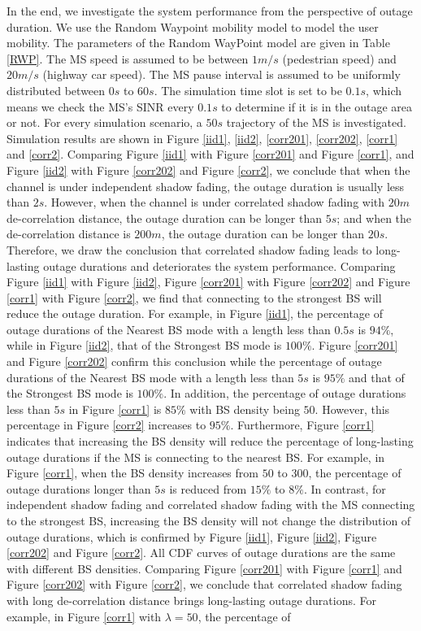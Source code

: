  \par In the end, we investigate the system performance from the perspective of outage duration. We use the Random Waypoint mobility model to model the user mobility. The parameters of the Random WayPoint model are given in Table \ref{RWP}. The MS speed is assumed to be between $1m/s$ (pedestrian speed) and $20m/s$ (highway car speed). The MS pause interval is assumed to be uniformly distributed between $0s$ to $60s$. The simulation time slot is set to be $0.1s$, which means we check the MS's SINR every $0.1s$ to determine if it is in the outage area or not. For every simulation scenario, a $50s$ trajectory of the MS is investigated. Simulation results are shown in Figure \ref{iid1}, \ref{iid2}, \ref{corr201}, \ref{corr202}, \ref{corr1} and \ref{corr2}. Comparing Figure \ref{iid1} with Figure \ref{corr201} and Figure \ref{corr1}, and Figure \ref{iid2} with Figure \ref{corr202} and Figure \ref{corr2}, we conclude that when the channel is under independent shadow fading, the outage duration is usually less than $2s$. However,  when the channel is under correlated shadow fading with $20m$ de-correlation distance, the outage duration can be longer than $5s$; and when the de-correlation distance is $200m$, the outage duration can be longer than $20s$. Therefore, we draw the conclusion that correlated shadow fading leads to long-lasting outage durations and deteriorates the system performance. Comparing Figure \ref{iid1} with Figure \ref{iid2}, Figure \ref{corr201} with Figure \ref{corr202} and Figure \ref{corr1} with Figure \ref{corr2}, we find that connecting to the strongest BS will reduce the outage duration. For example, in Figure \ref{iid1}, the percentage of outage durations of the Nearest BS mode with a length less than $0.5s$ is $94\%$, while in Figure \ref{iid2},  that of the Strongest BS mode is $100\%$.  Figure \ref{corr201} and Figure \ref{corr202} confirm this conclusion while the percentage of outage durations of the Nearest BS mode with a length less than $5s$ is $95\%$ and that of the Strongest BS mode is $100\%$. In addition, the percentage of outage durations less than $5s$ in Figure \ref{corr1} is $85\%$ with BS density being $50$. However, this percentage in Figure \ref{corr2} increases to $95\%$. Furthermore, Figure \ref{corr1} indicates that increasing the BS density will reduce the percentage of long-lasting outage durations if the MS is connecting to the nearest BS. For example, in Figure \ref{corr1}, when the BS density increases from $50$ to $300$, the percentage of outage durations longer than $5s$ is reduced from $15\%$ to $8\%$. In contrast, for independent shadow fading and correlated shadow fading with the MS connecting to the strongest BS, increasing the BS density will not change the distribution of outage durations, which is confirmed by Figure \ref{iid1}, Figure \ref{iid2}, Figure \ref{corr202} and Figure \ref{corr2}. All CDF curves of outage durations are the same with different BS densities. Comparing Figure \ref{corr201} with Figure \ref{corr1} and Figure \ref{corr202} with Figure \ref{corr2}, we conclude that correlated shadow fading with long de-correlation distance brings long-lasting outage durations. For example, in Figure \ref{corr1} with $\lambda = 50$, the percentage of 